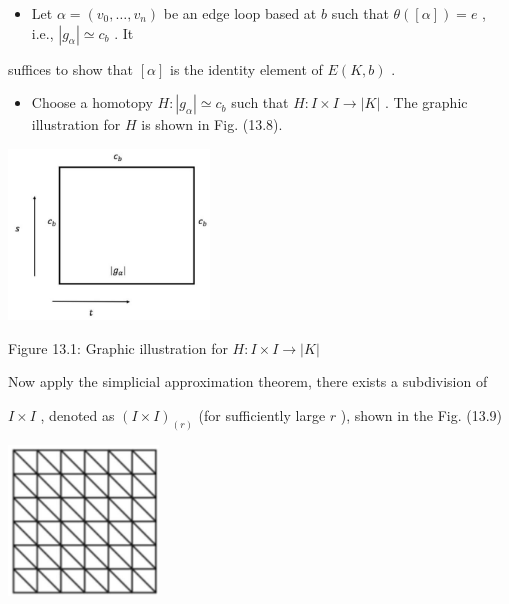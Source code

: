 \begin{itemize}
\item Let \(\alpha  = \left( {{v}_{0},\ldots ,{v}_{n}}\right)\) be an edge loop based at \(b\) such that \(\theta \left( \left\lbrack  \alpha \right\rbrack  \right)  = e\) , i.e., \(\left| {g}_{\alpha }\right|  \simeq  {c}_{b}\) . It
\end{itemize}

suffices to show that \(\left\lbrack  \alpha \right\rbrack\) is the identity element of \(E\left( {K,b}\right)\) .

\begin{itemize}
\item Choose a homotopy \(H : \left| {g}_{\alpha }\right|  \simeq  {c}_{b}\) such that \(H : I \times  I \rightarrow  \left| K\right|\) . The graphic illustration for \(H\) is shown in Fig. (13.8).
\end{itemize}

\begin{center}
\includegraphics[max width=0.4\textwidth]{images/bo_d2bcsrref24c73avs720_131_681_1563_562_478_0.jpg}
\end{center}
\hspace*{3em} 

Figure 13.1: Graphic illustration for \(H : I \times  I \rightarrow  \left| K\right|\)

Now apply the simplicial approximation theorem, there exists a subdivision of

\(I \times  I\) , denoted as \({\left( I \times  I\right) }_{\left( r\right) }\) (for sufficiently large \(r\) ), shown in the Fig. (13.9)

\begin{center}
\includegraphics[max width=0.3\textwidth]{images/bo_d2bcsrref24c73avs720_132_636_463_400_400_0.jpg}
\end{center}
\hspace*{3em} 

